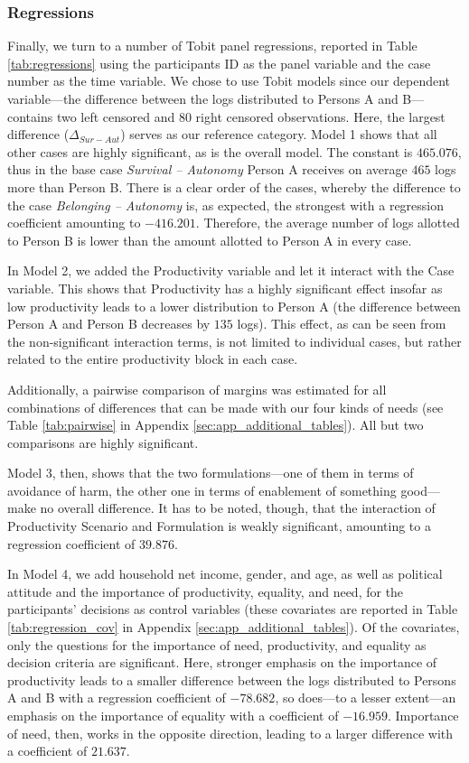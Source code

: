 \documentclass[egregdoesnotlikesansseriftitles]{scrartcl}
\begin{document}
\subsubsection{Regressions}\label{sec:results_regressions}
Finally, we turn to a number of Tobit panel regressions, reported in Table \ref{tab:regressions} using the participants ID as the panel variable and the case number as the time variable.
We chose to use Tobit models since our dependent variable---the difference between the logs distributed to Persons A and B---contains two left censored and 80 right censored observations.
Here, the largest difference ($\Delta_{Sur - Aut}$) serves as our reference category.
Model 1 shows that all other cases are highly significant, as is the overall model.
The constant is $465.076$, thus in the base case \textit{Survival -- Autonomy} Person A receives on average $465$ logs more than Person B.
There is a clear order of the cases, whereby the difference to the case \textit{Belonging -- Autonomy} is, as expected, the strongest with a regression coefficient amounting to $-416.201$.
Therefore, the average number of logs allotted to Person B is lower than the amount allotted to Person A in every case.

In Model 2, we added the Productivity variable and let it interact with the Case variable.
This shows that Productivity has a highly significant effect insofar as low productivity leads to a lower distribution to Person A (the difference between Person A and Person B decreases by $135$ logs).
This effect, as can be seen from the non-significant interaction terms, is not limited to individual cases, but rather related to the entire productivity block in each case.

Additionally, a pairwise comparison of margins was estimated for all combinations of differences that can be made with our four kinds of needs (see Table \ref{tab:pairwise} in Appendix \ref{sec:app_additional_tables}).
All but two comparisons are highly significant.

Model 3, then, shows that the two formulations---one of them in terms of avoidance of harm, the other one in terms of enablement of something good---make no overall difference. It has to be noted, though, that the interaction of Productivity Scenario and Formulation is weakly significant, amounting to a regression coefficient of $39.876$.

In Model 4, we add household net income, gender, and age, as well as political attitude and the importance of productivity, equality, and need, for the participants' decisions as control variables (these covariates are reported in Table \ref{tab:regression_cov} in Appendix \ref{sec:app_additional_tables}).
Of the covariates, only the questions for the importance of need, productivity, and equality as decision criteria are significant.
Here, stronger emphasis on the importance of productivity leads to a smaller difference between the logs distributed to Persons A and B with a regression coefficient of $-78.682$, so does---to a lesser extent---an emphasis on the importance of equality with a coefficient of $-16.959$.
Importance of need, then, works in the opposite direction, leading to a larger difference with a coefficient of $21.637$.
\end{document}
